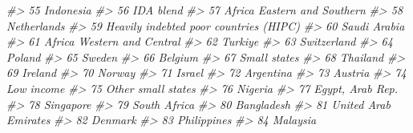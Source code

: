 \documentclass[
  xelatex, ja=standard]{bxjsbook}
\newenvironment{Shaded}{\begin{snugshade}}{\end{snugshade}}
\newcommand{\CommentTok}[1]{\textcolor[rgb]{0.56,0.35,0.01}{\textit{#1}}}
\theoremstyle{definition}
\theoremstyle{definition}
\theoremstyle{definition}
\theoremstyle{definition}
\theoremstyle{remark}
\begin{document}
\begin{Shaded}
\begin{Highlighting}[]
\CommentTok{\#\textgreater{} 55                                             Indonesia}
\CommentTok{\#\textgreater{} 56                                             IDA blend}
\CommentTok{\#\textgreater{} 57                           Africa Eastern and Southern}
\CommentTok{\#\textgreater{} 58                                           Netherlands}
\CommentTok{\#\textgreater{} 59                Heavily indebted poor countries (HIPC)}
\CommentTok{\#\textgreater{} 60                                          Saudi Arabia}
\CommentTok{\#\textgreater{} 61                            Africa Western and Central}
\CommentTok{\#\textgreater{} 62                                               Turkiye}
\CommentTok{\#\textgreater{} 63                                           Switzerland}
\CommentTok{\#\textgreater{} 64                                                Poland}
\CommentTok{\#\textgreater{} 65                                                Sweden}
\CommentTok{\#\textgreater{} 66                                               Belgium}
\CommentTok{\#\textgreater{} 67                                          Small states}
\CommentTok{\#\textgreater{} 68                                              Thailand}
\CommentTok{\#\textgreater{} 69                                               Ireland}
\CommentTok{\#\textgreater{} 70                                                Norway}
\CommentTok{\#\textgreater{} 71                                                Israel}
\CommentTok{\#\textgreater{} 72                                             Argentina}
\CommentTok{\#\textgreater{} 73                                               Austria}
\CommentTok{\#\textgreater{} 74                                            Low income}
\CommentTok{\#\textgreater{} 75                                    Other small states}
\CommentTok{\#\textgreater{} 76                                               Nigeria}
\CommentTok{\#\textgreater{} 77                                      Egypt, Arab Rep.}
\CommentTok{\#\textgreater{} 78                                             Singapore}
\CommentTok{\#\textgreater{} 79                                          South Africa}
\CommentTok{\#\textgreater{} 80                                            Bangladesh}
\CommentTok{\#\textgreater{} 81                                  United Arab Emirates}
\CommentTok{\#\textgreater{} 82                                               Denmark}
\CommentTok{\#\textgreater{} 83                                           Philippines}
\CommentTok{\#\textgreater{} 84                                              Malaysia}

\end{Highlighting}
\end{Shaded}
\end{document}
